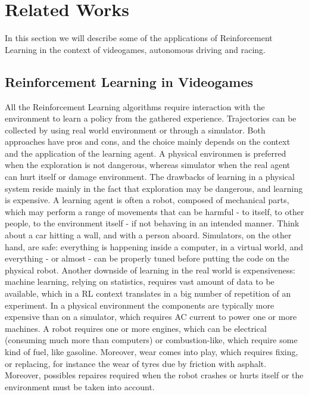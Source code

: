 \section{Related Works}



In this section we will describe some of the applications of Reinforcement Learning in the context of videogames, autonomous driving and racing. 


\subsection{Reinforcement Learning in Videogames}

All the Reinforcement Learning algorithms require interaction with the environment to learn a policy from the gathered experience. Trajectories can be collected by using real world environment or through a simulator. 
Both approaches have pros and cons, and the choice mainly depends on the context and the application of the learning agent. 
A physical environmen is preferred when the exploration is not dangerous, whereas simulator when the real agent can hurt itself or damage environment. 
The drawbacks of learning in a physical system reside mainly in the fact that exploration may be dangerous, and learning is expensive. A learning agent is often a robot, composed of mechanical parts, which may perform a range of movements that can be harmful - to itself, to other people, to the environment itself - if not behaving in an intended manner. Think about a car hitting a wall, and with a person aboard. Simulators, on the other hand, are safe: everything is happening inside a computer, in a virtual world, and everything - or almost - can be properly tuned before putting the code on the physical robot. Another downside of learning in the real world is expensiveness: machine learning, relying on statistics, requires vast amount of data to be available, which in a RL context translates in a big number of repetition of an experiment. In a physical environment the components are typically more expensive than on a simulator, which requires AC current to power one or more machines. A robot requires one or more engines, which can be electrical (consuming much more than computers) or combustion-like, which require some kind of fuel, like gasoline. Moreover, wear comes into play, which requires fixing, or replacing, for instance the wear of tyres due by friction with asphalt.  Moreover, possibles repaires required when the robot crashes or hurts itself or the environment must be taken into account. 
